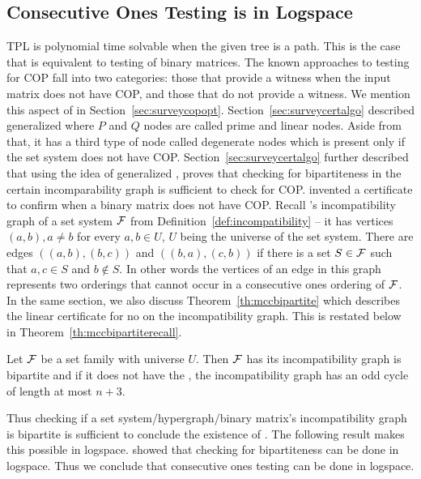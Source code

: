 \subsection{Consecutive Ones Testing is in Logspace}
\label{sec:cotlogspace}
TPL is polynomial time solvable when the given tree is a path. This is
the case that is equivalent to \COP testing of binary matrices.
The known approaches to testing for COP fall into two categories:
those that provide a witness when the input matrix does not have COP,
and those that do not provide a witness.  We mention this aspect of
\COT in Section~\ref{sec:surveycopopt}.
Section~\ref{sec:surveycertalgo} described generalized \PQtree where
$P$ and $Q$ nodes are called prime and linear nodes. Aside from that,
it has a third type of node called degenerate nodes which is present
only if the set system does not have COP.
Section~\ref{sec:surveycertalgo} further described that using the idea
of generalized \PQtree, \cite{mcc04} proves that checking for
bipartiteness in the certain incomparability graph is sufficient to
check for COP.  \cite{mcc04} invented a certificate to confirm when a
binary matrix does not have COP.  Recall \cite{mcc04}'s
incompatibility graph of a set system ${\cal F}$ from
Definition~\ref{def:incompatibility} -- it has vertices $(a,b), a \ne
b$ for every $a, b \in U$, $U$ being the universe of the set
system. There are edges $((a,b),(b,c))$ and $((b,a),(c,b))$ if there
is a set $S \in {\cal F}$ such that $a, c \in S$ and $b \notin S$. In other
words the vertices of an edge in this graph represents two orderings
that cannot occur in a consecutive ones ordering of ${\cal F}$.  In the
same section, we also discuss Theorem~\ref{th:mccbipartite} which
describes the linear certificate for no \COP on the incompatibility
graph.  This is restated below in Theorem~\ref{th:mccbipartiterecall}.

\begin{theoremsansproof} 
  \label{th:mccbipartiterecall}
  Let ${\cal F}$ be a set family with universe $U$. Then ${\cal F}$ has \COP
  \iff its incompatibility graph is bipartite and if it does not have
  the \COP, the incompatibility graph has an odd cycle of length at
  most $n+3$.
\end{theoremsansproof}
 
Thus checking if a set system/hypergraph/binary matrix's
incompatibility graph is bipartite is sufficient to conclude the
existence of \COP. The following result makes this possible in
logspace. \cite{rei84} showed that checking for bipartiteness can be
done in logspace. Thus we conclude that consecutive ones testing can
be done in logspace.


